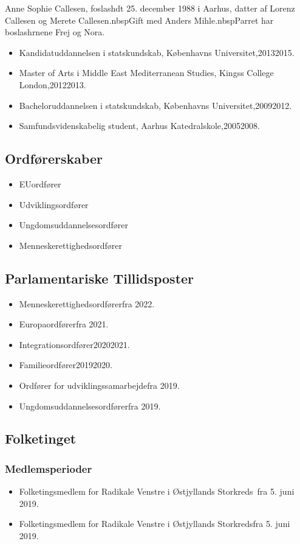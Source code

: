 \documentclass[11pt, a4paper]{awesome-cv}
\begin{document}
\makecvheader[R]
\makelettertitle
\begin{cvletter}
Anne Sophie Callesen, foslashdt 25. december 1988 i Aarhus, datter af Lorenz Callesen og Merete Callesen.nbspGift med Anders Mihle.nbspParret har boslashrnene Frej og Nora.

\begin{itemize}
\item Kandidatuddannelsen i statskundskab, Københavns Universitet,20132015.
\item Master of Arts i Middle East  Mediterranean Studies, Kingss College London,20122013.
\item Bacheloruddannelsen i statskundskab, Københavns Universitet,20092012.
\item Samfundsvidenskabelig student, Aarhus Katedralskole,20052008.
\end{itemize}
\subsection*{Ordførerskaber}
\begin{itemize}
\item EUordfører
\item Udviklingsordfører
\item Ungdomsuddannelsesordfører
\item Menneskerettighedsordfører
\end{itemize}
\subsection*{Parlamentariske Tillidsposter}
\begin{itemize}
\item Menneskerettighedsordførerfra 2022.
\item Europaordførerfra 2021.
\item Integrationsordfører20202021.
\item Familieordfører20192020.
\item Ordfører for udviklingssamarbejdefra 2019.
\item Ungdomsuddannelsesordførerfra 2019.
\end{itemize}
\subsection*{Folketinget}
\subsubsection*{Medlemsperioder}
\begin{itemize}
\item Folketingsmedlem for Radikale Venstre i Østjyllands Storkreds fra 5. juni 2019.
\item Folketingsmedlem for Radikale Venstre i Østjyllands Storkredsfra 5. juni 2019.
\end{itemize}

\end{cvletter}
\end{document}

